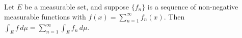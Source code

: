 Let $E$ be a measurable set, and suppose $\{f_n\}$ is a sequence of non-negative measurable functions with $f(x) = \sum_{n=1}^{\infty} f_n(x)$. Then $\int_E f \, d\mu = \sum_{n=1}^{\infty} \int_E f_n \, d\mu$.
